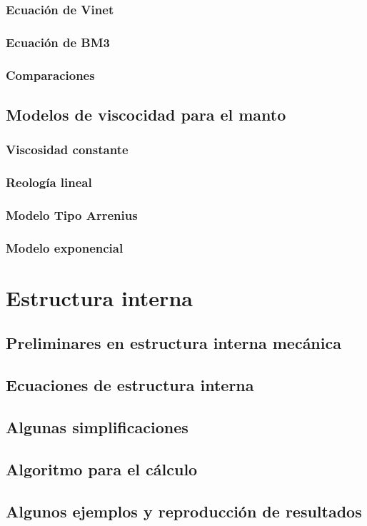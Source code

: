 \documentclass[10pt]{book}
\begin{document}
		\subsection{Ecuación de Vinet}
		\subsection{Ecuación de BM3}
		\subsection{Comparaciones}
	\section{Modelos de viscocidad para el manto}
		\subsection{Viscosidad constante}
		\subsection{Reología lineal}
		\subsection{Modelo Tipo Arrenius}
		\subsection{Modelo exponencial}

\chapter{Estructura interna}
	\section{Preliminares en estructura interna mecánica}
	\section{Ecuaciones de estructura interna}
	\section{Algunas simplificaciones}
	\section{Algoritmo para el cálculo}
	\section{Algunos ejemplos y reproducción de resultados}
\end{document}
